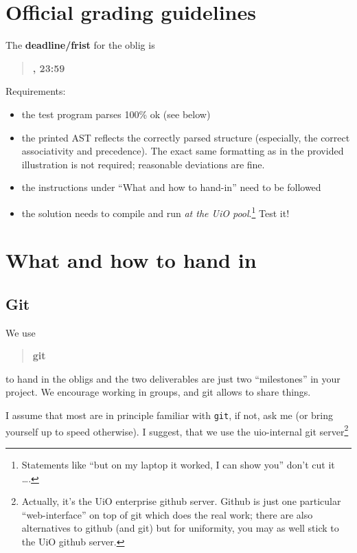 \documentclass[10pt,freeform]{handout}[2014/08/13]
\begin{document}
\thispagestyle{empty}

\section{Official grading guidelines}
\label{sec:official-info}




\hrulefill{}

The \textbf{deadline/frist}  for the oblig is

\begin{quote}
  \textbf{\deadlineone, 23:59}
\end{quote}

Requirements:


\begin{itemize}
\item the test program parses 100\% ok (see below)
\item the printed AST reflects the correctly parsed structure (especially,
  the correct associativity and precedence). The exact same formatting as
  in the provided illustration is not required; reasonable deviations are
  fine.
\item the instructions under ``What and how to  hand-in'' need to be followed
\item the solution needs to compile and run \emph{at the UiO
    pool}.\footnote{Statements like ``but on my laptop it worked, I can show
    you'' don't cut it \ldots.} Test it!
\end{itemize}

\hrulefill




\section{What and how to hand in}
\label{sec:what-how}


\subsection{Git}
\label{sec:git}



We use
\begin{quote}
  \textbf{git}   
\end{quote}
to hand in the obligs and the two deliverables are just two ``milestones''
in your project. We encourage working in groups, and git allows to share
things.

I assume that most are in principle familiar with \texttt{git}, if not, ask
me (or bring yourself up to speed otherwise).  I suggest, that we use the
uio-internal git server\footnote{Actually, it's the UiO enterprise github
  server. Github is just one particular ``web-interface'' on top of git
  which does the real work; there are also alternatives to github (and git)
  but for uniformity, you may as well stick to the UiO github server.}
\end{document}
